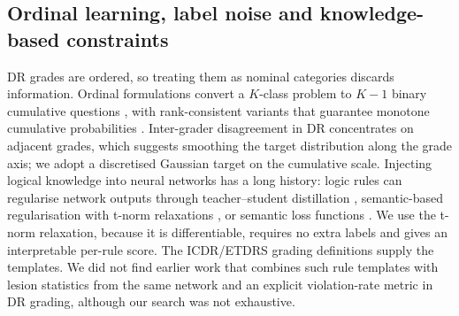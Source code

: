 \subsection{Ordinal learning, label noise and knowledge-based constraints}
DR grades are ordered, so treating them as nominal categories discards information. Ordinal formulations convert a $K$-class problem to $K\!-\!1$ binary cumulative questions \citep{niu2016ordinal}, with rank-consistent variants that guarantee monotone cumulative probabilities \citep{cao2020coral,shi2023corn}. Inter-grader disagreement in DR concentrates on adjacent grades, which suggests smoothing the target distribution along the grade axis; we adopt a discretised Gaussian target on the cumulative scale. Injecting logical knowledge into neural networks has a long history: logic rules can regularise network outputs through teacher--student distillation \citep{hu2016logic}, semantic-based regularisation with t-norm relaxations \citep{diligenti2017sbr}, or semantic loss functions \citep{xu2018semanticloss}. We use the t-norm relaxation, because it is differentiable, requires no extra labels and gives an interpretable per-rule score. The ICDR/ETDRS grading definitions \citep{wilkinson2003,etdrs1991} supply the templates. We did not find earlier work that combines such rule templates with lesion statistics from the same network and an explicit violation-rate metric in DR grading, although our search was not exhaustive.

